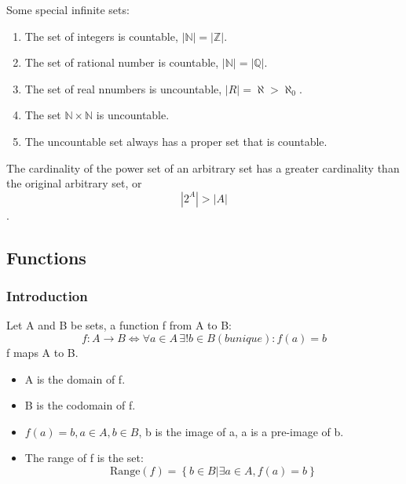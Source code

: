 Some special infinite sets: 
\begin{enumerate}
    \item The set of integers is countable, $|\mathbb{N}|=|\mathbb{Z}|$.
    \item The set of rational number is countable, $|\mathbb{N}|=|\mathbb{Q}|$. 
    \item The set of real nnumbers is uncountable, $|R|=\aleph >\aleph_0 $.
    \item The set $\mathbb{N}\times \mathbb{N}$ is uncountable. 
    \item The uncountable set always has a proper set that is countable. 
\end{enumerate}

\begin{theorem}
    The cardinality of the power set of an arbitrary set has a greater cardinality than the original arbitrary set, or 
    \[ \left|2^A\right| > |A| \].
\end{theorem}

\subsection{Functions}

\subsubsection{Introduction}
\begin{definition}
    Let A and B be sets, a \textcolor{light_red}{function f} from A to B: 
    \[
        f : A \longrightarrow B \Longleftrightarrow \forall a \in A \, \exists !b \in B (b unique): f(a)=b
    \]
    f maps A to B. 
    \begin{itemize}
        \item A is \textcolor{light_red}{the domain} of f.
        \item B is \textcolor{light_red}{the codomain} of f.
        \item $f(a)=b, a\in A, b \in B$, b is the \textcolor{light_red}{image} of a, a is a \textcolor{light_red}{pre-image} of b. 
        \item The \textcolor{light_red}{range} of f is the set: 
        \[ \mathrm{Range}(f)=\left\{ b \in B | \exists a \in A , f(a)=b \right\} \]
    \end{itemize}
\end{definition}

